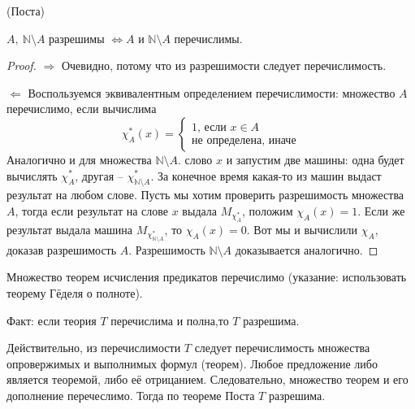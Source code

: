\par \begin{theorem}{(Поста)}
\par$A, \ \mathbb{N}\setminus A$ разрешимы $\iff A$ и $\mathbb{N}\setminus A$ перечислимы.
\begin{proof}
\par$\Longrightarrow$ Очевидно, потому что из разрешимости следует перечислимость.
\par$\Longleftarrow$ Воспользуемся эквивалентным определением перечислимости: множество $A$ перечислимо, если
	вычислима \begin{equation*}
    \chi^*_{A}(x) = 
    \begin{cases}
    \text{1, если $x \in A$}\\
    \text{не определена, иначе}
    \end{cases}
\end{equation*}
Аналогично и для множества $\mathbb{N}\setminus A$. 
 слово $x$ и запустим две машины: одна будет вычислять $\chi^*_{A}$, другая --
	$\chi^*_{\mathbb{N}\setminus A}$. За конечное время какая-то из машин выдаст результат на любом слове. Пусть мы
	хотим проверить разрешимость множества $A$, тогда если результат на слове $x$ выдала $M_{\chi^*_{A}}$, положим
	$\chi_{A}(x) = 1$. Если же результат выдала машина $M_{\chi^*_{\mathbb{N}\setminus A}}$, то $\chi_{A}(x) = 0$.
	Вот мы и вычислили $\chi_{A}$, доказав разрешимость $A$. Разрешимость $\mathbb{N}\setminus A$ доказывается
	аналогично.
\end{proof}
\end{theorem}

\begin{corollary}
Множество теорем исчисления предикатов перечислимо (указание: использовать теорему Гёделя о полноте).
\end{corollary}
\par Факт: если теория $T$ перечислима и полна,то $T$ разрешима.
\par Действительно, из перечислимости $T$ следует перечислимость множества опровержимых и выполнимых формул
(теорем). Любое предложение либо является теоремой, либо её отрицанием. Следовательно, множество теорем и его
дополнение перечеслимо. Тогда по теореме Поста $T$ разрешима.
